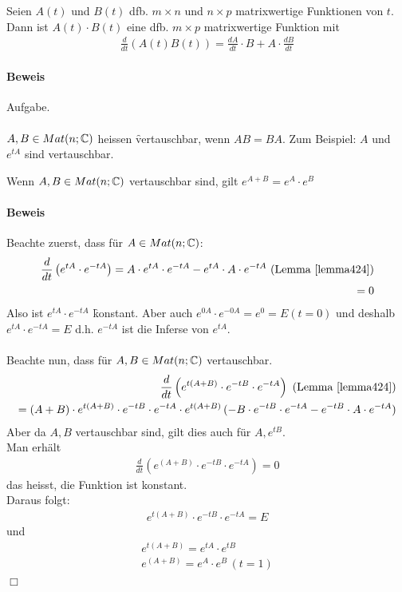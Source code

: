 \begin{lemma} %
\label{lemma424}
Seien $A(t)$ und $B(t)$ dfb. $m \times n$ und $n \times p$ matrixwertige Funktionen von $t$. Dann ist $A(t)\cdot B(t)$ eine dfb. $m \times p$ matrixwertige Funktion mit
\begin{align}
\frac{d}{dt}(A(t) B(t)) = \frac{dA}{dt}\cdot B + A \cdot \frac{dB}{dt}
\end{align}
\end{lemma}

\paragraph{Beweis}
Aufgabe. \\\\
$A, B \in Mat(n; \mathbb{C})$ heissen \f{vertauschbar}, wenn $AB = BA$.
Zum Beispiel: $A$ und $e^{tA}$ sind vertauschbar.

\begin{lemma} %
\label{lemma425}
Wenn $A, B \in Mat(n; \mathbb{C})$ vertauschbar sind, gilt $e^{A+B} = e^{A} \cdot e^{B}$
\end{lemma}

\paragraph{Beweis}
Beachte zuerst, dass für $A \in Mat(n; \mathbb{C})$:
\begin{align}
\frac{d}{dt} \left( e^{tA} \cdot e^{-tA} \right) = A \cdot e^{tA} \cdot e^{-tA} - e^{tA} \cdot A \cdot e^{-tA} \text{ (Lemma \ref{lemma424})} \\
= 0
\end{align}
Also ist $e^{tA}\cdot e^{-tA}$ \f{konstant}. Aber auch $e^{0 A}\cdot e^{-0 A} = e^{0} = E (t=0)$ und deshalb $e^{tA} \cdot e^{-tA} = E$ d.h. $e^{-tA}$ ist die Inferse von $e^{tA}$. \\\\
Beachte nun, dass für $A, B \in Mat(n; \mathbb{C})$ vertauschbar.
\begin{align}
\frac{d}{dt} \left( e^{t(A+B)} \cdot e^{-tB} \cdot e^{-tA}\right) \text{ (Lemma \ref{lemma424})} \\
= (A+B)\cdot e^{t(A+B)} \cdot e^{-tB} \cdot e^{-tA} \cdot e^{t(A+B)}\, (-B\cdot e^{-tB} \cdot e^{-tA} - e^{-t B} \cdot A \cdot e^{-tA})
\end{align}
Aber da $A, B$ vertauschbar sind, gilt dies auch für $A, e^{tB}$.\\
Man erhält
\begin{align}
\frac{d}{dt} \left( e^{(A+B)} \cdot e^{-tB}\cdot e^{-tA}\right) = 0
\end{align}
das heisst, die Funktion ist konstant.\\
Daraus folgt:
\begin{align}
e^{t(A+B)}\cdot e^{-tB} \cdot e^{-tA} = E
\end{align}
und
\begin{align}
e^{t(A+B)} = e^{tA}\cdot e^{tB} \\
e^{(A+B)} = e^{A} \cdot e^{B}\, (t=1)
\end{align}
\hspace*{1cm}\hfill $\Box$

